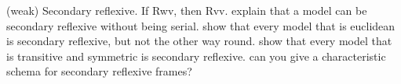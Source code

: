 \documentclass[../../../include/open-logic-section]{subfiles}
\begin{document}


\begin{prob}
    (weak) Secondary reflexive. If Rwv, then Rvv.
    explain that a model can be secondary reflexive without being serial.
    show that every model that is euclidean is secondary reflexive, but not the other way round.
    show that every model that is transitive and symmetric is secondary reflexive.
    can you give a characteristic schema for secondary reflexive frames?
\end{prob}
\end{document}
